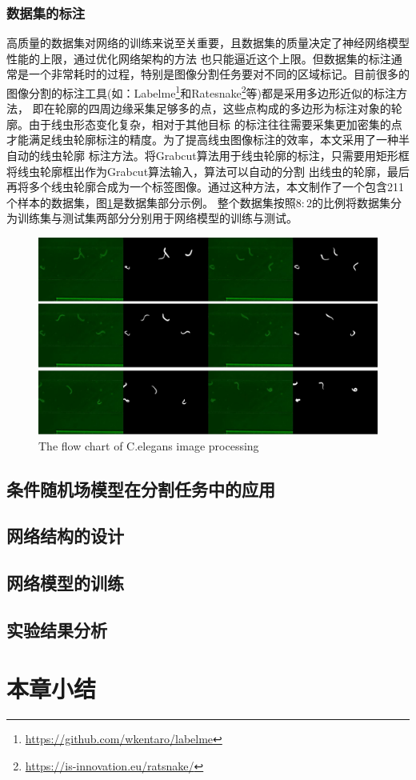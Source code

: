 \subsubsection{数据集的标注}
	高质量的数据集对网络的训练来说至关重要，且数据集的质量决定了神经网络模型性能的上限，通过优化网络架构的方法
	也只能逼近这个上限。但数据集的标注通常是一个非常耗时的过程，特别是图像分割任务要对不同的区域标记。目前很多的
	图像分割的标注工具(如：Labelme\footnote{\url{https://github.com/wkentaro/labelme}}和Ratesnake\footnote{\url{https://is-innovation.eu/ratsnake/}}等)都是采用多边形近似的标注方法，
	即在轮廓的四周边缘采集足够多的点，这些点构成的多边形为标注对象的轮廓。由于线虫形态变化复杂，相对于其他目标
	的标注往往需要采集更加密集的点才能满足线虫轮廓标注的精度。为了提高线虫图像标注的效率，本文采用了一种半自动的线虫轮廓
	标注方法。将Grabcut算法用于线虫轮廓的标注，只需要用矩形框将线虫轮廓框出作为Grabcut算法输入，算法可以自动的分割
	出线虫的轮廓，最后再将多个线虫轮廓合成为一个标签图像。通过这种方法，本文制作了一个包含211个样本的数据集，图\ref{fig:dataset}是数据集部分示例。
	整个数据集按照$8:2$的比例将数据集分为训练集与测试集两部分分别用于网络模型的训练与测试。
	\begin{figure}[h]
	  \centering
	  \includegraphics[width=14cm]{figure/chap3/dataset.jpg}
		{The flow chart of C.elegans image processing}
	  \label{fig:dataset}
	\end{figure}
\subsection{条件随机场模型在分割任务中的应用}
	
\subsection{网络结构的设计}

\subsection{网络模型的训练}

\subsection{实验结果分析}

\section{本章小结}